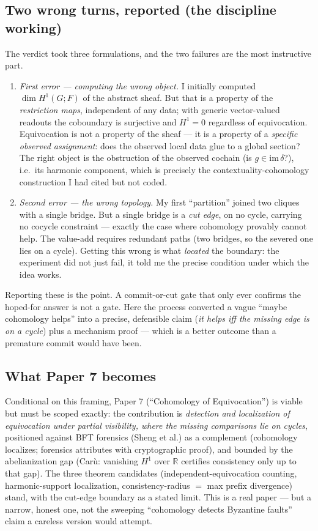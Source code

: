\documentclass[11pt,a4paper]{article}
\begin{document}
\subsection{Two wrong turns, reported (the discipline working)}
The verdict took three formulations, and the two failures are the most instructive part.
\begin{enumerate}[leftmargin=1.5em]
\item \emph{First error --- computing the wrong object.} I initially computed $\dim H^1(G;F)$ of the abstract sheaf. But that is a property of the \emph{restriction maps}, independent of any data; with generic vector-valued readouts the coboundary is surjective and $H^1=0$ regardless of equivocation. Equivocation is not a property of the sheaf --- it is a property of a \emph{specific observed assignment}: does the observed local data glue to a global section? The right object is the obstruction of the observed cochain (is $g\in\mathrm{im}\,\delta$?), i.e.\ its harmonic component, which is precisely the contextuality-cohomology construction I had cited but not coded.
\item \emph{Second error --- the wrong topology.} My first ``partition'' joined two cliques with a single bridge. But a single bridge is a \emph{cut edge}, on no cycle, carrying no cocycle constraint --- exactly the case where cohomology provably cannot help. The value-add requires redundant paths (two bridges, so the severed one lies on a cycle). Getting this wrong is what \emph{located} the boundary: the experiment did not just fail, it told me the precise condition under which the idea works.
\end{enumerate}
Reporting these is the point. A commit-or-cut gate that only ever confirms the hoped-for answer is not a gate. Here the process converted a vague ``maybe cohomology helps'' into a precise, defensible claim (\emph{it helps iff the missing edge is on a cycle}) plus a mechanism proof --- which is a better outcome than a premature commit would have been.

\subsection{What Paper 7 becomes}
Conditional on this framing, Paper 7 (``Cohomology of Equivocation'') is viable but must be scoped exactly: the contribution is \emph{detection and localization of equivocation under partial visibility, where the missing comparisons lie on cycles}, positioned against BFT forensics (Sheng et al.) as a complement (cohomology localizes; forensics attributes with cryptographic proof), and bounded by the abelianization gap (Car\`u: vanishing $H^1$ over $\mathbb{R}$ certifies consistency only up to that gap). The three theorem candidates (independent-equivocation counting, harmonic-support localization, consistency-radius $=$ max prefix divergence) stand, with the cut-edge boundary as a stated limit. This is a real paper --- but a narrow, honest one, not the sweeping ``cohomology detects Byzantine faults'' claim a careless version would attempt.
\end{document}

